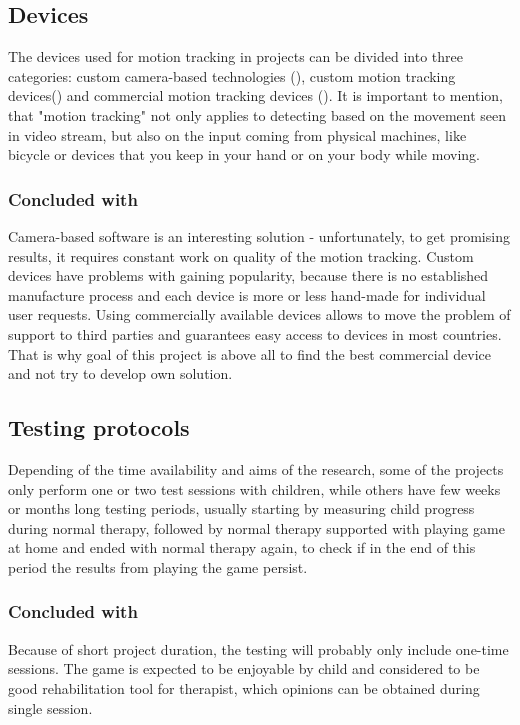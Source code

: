 \subsection{Devices}
The devices used for motion tracking in projects can be divided into three categories: custom camera-based technologies (\cite{vr_cp}), custom motion tracking devices(\cite{vr_cp,bimanual,action}) and commercial motion tracking devices (\cite{game_custom,inverse,game_xbox_360,balance}). It is important to mention, that "motion tracking" not only applies to detecting based on the movement seen in video stream, but also on the input coming from physical machines, like bicycle or devices that you keep in your hand or on your body while moving. 
\subsubsection{Concluded with}
Camera-based software is an interesting solution - unfortunately, to get promising results, it requires constant work on quality of the motion tracking. Custom devices have problems with gaining popularity, because there is no established manufacture process and each device is more or less hand-made for individual user requests. Using commercially available devices allows to move the problem of support to third parties and guarantees easy access to devices in most countries. That is why goal of this project is above all to find the best commercial device and not try to develop own solution. 
\subsection{Testing protocols}
Depending of the time availability and aims of the research, some of the projects only perform one or two test sessions with children, while others have few weeks or months long testing periods, usually starting by measuring child progress during normal therapy, followed by normal therapy supported with playing game at home and ended with normal therapy again, to check if in the end of this period the results from playing the game persist.  
\subsubsection{Concluded with}
Because of short project duration, the testing will probably only include one-time sessions. The game is expected to be enjoyable by child and considered to be good rehabilitation tool for therapist, which opinions can be obtained during single session.
